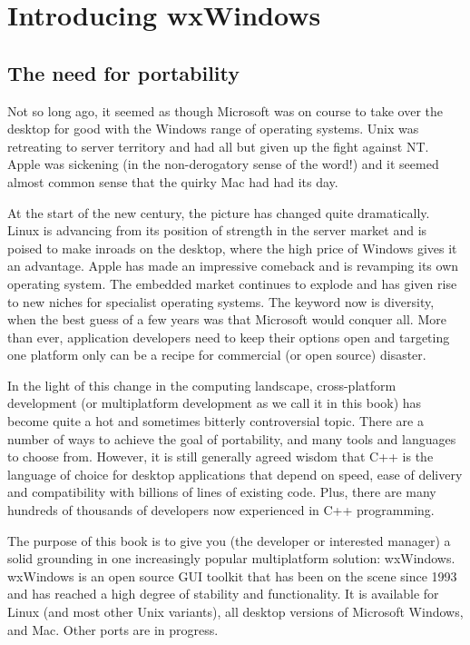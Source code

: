 \chapter{Introducing wxWindows}\label{chapintro}
%
%
\setfooter{\thepage}{}{}{}{}{\thepage}%

\section{The need for portability}

Not so long ago, it seemed as though Microsoft was on course to
take over the desktop for good with the Windows range of
operating systems. Unix was retreating to server territory and
had all but given up the fight against NT. Apple was sickening
(in the non-derogatory sense of the word!) and it seemed almost
common sense that the quirky Mac had had its day.

At the start of the new century, the picture has changed quite
dramatically. Linux is advancing from its position of strength
in the server market and is poised to make inroads on the
desktop, where the high price of Windows gives it an advantage.
Apple has made an impressive comeback and is revamping its own
operating system. The embedded market continues to explode and
has given rise to new niches for specialist operating systems.
The keyword now is diversity, when the best guess of a few years
was that Microsoft would conquer all. More than ever,
application developers need to keep their options open and
targeting one platform only can be a recipe for commercial (or
open source) disaster.

In the light of this change in the computing landscape,
cross-platform development (or multiplatform development as we
call it in this book) has become quite a hot and sometimes
bitterly controversial topic. There are a number of ways to
achieve the goal of portability, and many tools and languages to choose from.
However, it is still generally agreed wisdom that C++ is the
language of choice for desktop applications that depend on
speed, ease of delivery and compatibility with billions of lines
of existing code. Plus, there are many hundreds of thousands of
developers now experienced in C++ programming.

The purpose of this book is to give you (the developer or
interested manager) a solid grounding in one increasingly
popular multiplatform solution: wxWindows. wxWindows is an open
source GUI toolkit that has been on the scene since 1993 and has
reached a high degree of stability and functionality. It is
available for Linux (and most other Unix variants), all desktop
versions of Microsoft Windows, and Mac. Other ports are in
progress.

